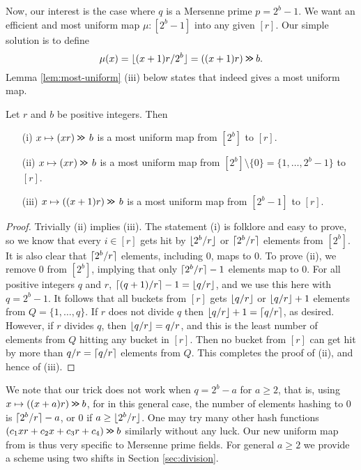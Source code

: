 Now, our interest is the case where $q$ is a Mersenne prime $p=2^b-1$. We want
an efficient and most uniform map $\mu:[2^b-1]$ into any given $[r]$.
Our simple solution is to define
\begin{equation}\label{eq:most-uniform}
   \mu(x)=\lfloor {(x+1)r/2^b} \rfloor=((x+1)r)\mathbin{\texttt{>\!>}} b.
\end{equation}
Lemma \ref{lem:most-uniform} (iii) below 
states that  indeed
gives a most uniform map. 
\begin{lemma}\label{lem:most-uniform} Let $r$ and $b$ be positive integers.
   Then
   \begin{itemize}
      \item[(i)] $x\mapsto (xr)\mathbin{\texttt{>\!>}}\,b$ is a most
         uniform map from $[2^b]$ to $[r]$.
      \item[(ii)] $x\mapsto (xr)\mathbin{\texttt{>\!>}}\,b$ is a most
         uniform map from $[2^b]\setminus\{0\}=\{1,\ldots,2^b-1\}$ to $[r]$.
      \item[(iii)] $x\mapsto ((x+1)r)\mathbin{\texttt{>\!>}} \, b$ is a most
         uniform map from $[2^b-1]$ to $[r]$.
   \end{itemize}
\end{lemma}
\begin{proof}
   Trivially (ii) implies (iii). 
   The statement (i) is folklore and easy to prove, so we know that every
   $i\in[r]$ gets hit by $\lfloor {2^b/r} \rfloor$ or $\lceil {2^b/r}\rceil$ elements from
   $[2^b]$. It is also clear that $\lceil {2^b/r}\rceil$ elements, including $0$,
   maps to $0$. To prove (ii), we remove $0$ from $[2^b]$, 
   implying that only
   $\lceil {2^b/r}\rceil-1$ elements map to $0$. For all positive integers $q$
   and $r$, $\lceil {(q+1)/r}\rceil-1=\lfloor {q/r} \rfloor$, and we use this here with 
   $q=2^b-1$. It follows that all buckets from $[r]$ gets $\lfloor {q/r} \rfloor$
   or $\lfloor {q/r} \rfloor+1$ elements from $Q=\{1,\ldots,q\}$. If $r$ does
   not divide $q$ then $\lfloor {q/r} \rfloor+1=\lceil {q/r}\rceil$, as desired. However,
   if $r$ divides $q$, then $\lfloor {q/r} \rfloor=q/r$, and this
   is the least number of elements from $Q$ hitting any bucket in $[r]$. Then 
   no bucket from $[r]$ can get hit by more than $q/r=\lceil {q/r}\rceil$ 
   elements from $Q$. This completes the proof of (ii), and hence of (iii).
\end{proof}
We note that our trick does not work when $q=2^b-a$ for $a\geq 2$, that is,
using $x\mapsto ((x+a)r)\mathbin{\texttt{>\!>}}  b$, for in this general case, 
the number of elements hashing to $0$ is $\lceil {2^b/r}\rceil-a$, or $0$ if
$a\geq \lfloor {2^b/r} \rfloor$.
One may try many other hash functions $(c_1 x r+ c_2 x+ c_3 r + c_4) \mathbin{\texttt{>\!>}} b$ similarly without any luck.
Our new uniform map from  is thus very specific to Mersenne prime fields.
For general $a\ge 2$ we provide a scheme using two shifts in Section \ref{sec:division}.

